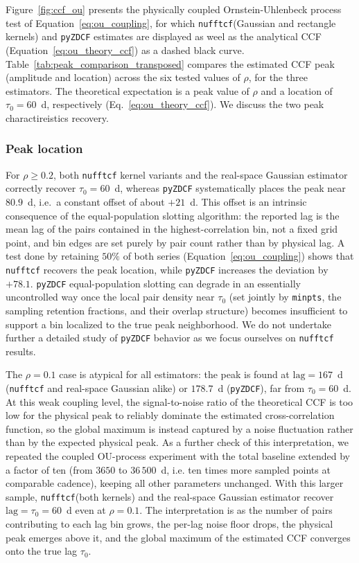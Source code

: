 \documentclass[twocolumn,10pt]{article}
\newcommand{\nufftcf}{\texttt{nufftcf}\xspace}
\newcommand{\pyzdcf}{\texttt{pyZDCF}\xspace}
\begin{document}
Figure~\ref{fig:ccf_ou} presents the physically coupled  Ornstein-Uhlenbeck process test
of Equation~\ref{eq:ou_coupling},  for which \nufftcf (Gaussian and rectangle kernels) and
\pyzdcf estimates are displayed as weel as the analytical CCF
(Equation~\ref{eq:ou_theory_ccf}) as a dashed black curve. 
Table~\ref{tab:peak_comparison_transposed} compares the estimated CCF peak
(amplitude and location) across the six tested values of $\rho$, for the three
estimators. The theoretical expectation is a peak value of $\rho$ and a location of $\tau_0=60$~d, respectively
(Eq.~\ref{eq:ou_theory_ccf}). We discuss the two peak charactireistics recovery.
%
\subsubsection{Peak location}
%
For $\rho \geq 0.2$, both \nufftcf kernel variants and the real-space Gaussian
estimator correctly recover $\tau_0=60$~d, whereas \pyzdcf systematically
places the peak near $80.9$~d, i.e.\ a constant offset of about $+21$~d.
This offset is an intrinsic consequence of the equal-population slotting
algorithm: the reported lag is the mean lag of the pairs contained in the
highest-correlation bin, not a fixed grid point, and bin edges are set
purely by pair count rather than by physical lag. A test done by retaining $50\%$ of both
series (Equation~\ref{eq:ou_coupling}) shows that \nufftcf recovers the peak location,
while \pyzdcf increases the deviation by $+78.1$. \pyzdcf
equal-population slotting can degrade in an essentially uncontrolled way
once the local pair density near $\tau_0$ (set jointly by \texttt{minpts}, the
sampling retention fractions, and their overlap structure) becomes
insufficient to support a bin localized to the true peak neighborhood. We do not undertake further 
a detailed study of \pyzdcf behavior as we focus ourselves on \nufftcf results. 

The $\rho=0.1$ case is atypical for all estimators: the peak is found at
$\mathrm{lag}=167$~d (\nufftcf and real-space Gaussian alike) or $178.7$~d
(\pyzdcf), far from $\tau_0=60$~d. At this weak coupling level, the
signal-to-noise ratio of the theoretical CCF is too low for the physical
peak to reliably dominate the estimated cross-correlation function, so the
global maximum is instead captured by a noise fluctuation rather than by the
expected physical peak. As a further check of this interpretation, we repeated the coupled OU-process experiment with the total baseline extended by a factor of ten (from
$3650$ to $36\,500$~d, i.e. ten times more sampled points at
comparable cadence), keeping all other parameters unchanged. With this
larger sample, \nufftcf (both kernels) and the real-space Gaussian estimator
recover $\mathrm{lag}=\tau_0=60$~d even at $\rho=0.1$.
The interpretation is as the number of pairs contributing to each lag
bin grows, the per-lag noise floor drops, the physical peak emerges above it,
and the global maximum of the estimated CCF converges onto the true lag
$\tau_0$.
%
\end{document}
